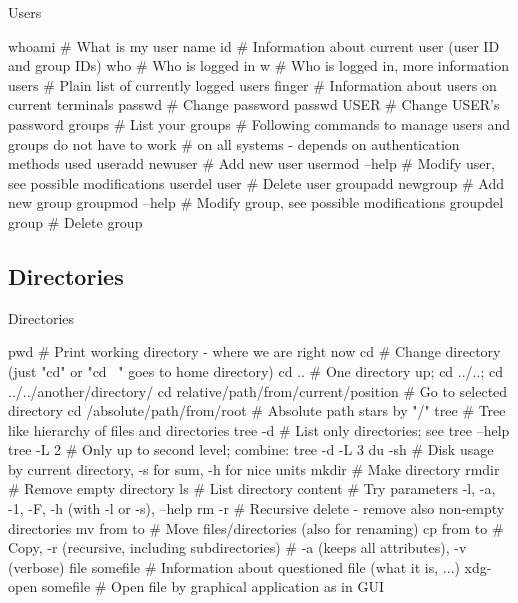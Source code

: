 \documentclass[hyperref={bookmarks=true, unicode=true, colorlinks=true, pdftitle={Linux, command line and MetaCentrum}, plainpages=false, pdfauthor={Vojtech Zeisek}, pdfsubject={Course about use of Linux command line, writing shell scripts and using MetaCentrum of CESNET}, pdfcreator={XeLaTeX, http://www.xelatex.org/}, pdfkeywords={Linux, GNU, BASH, shell, command line, MetaCentrum}, linkcolor=Sienna, anchorcolor=black, citecolor=green, filecolor=magenta, menucolor=Sienna, urlcolor=cyan, pdftex}, compress, ucs, xelatex, xcolor=svgnames, 11pt]{beamer}
\begin{document}
\begin{frame}[fragile]{Users}
  \begin{bashcode}
    whoami # What is my user name
    id # Information about current user (user ID and group IDs)
    who # Who is logged in
    w # Who is logged in, more information
    users # Plain list of currently logged users
    finger # Information about users on current terminals
    passwd # Change password
    passwd USER # Change USER's password
    groups # List your groups
    # Following commands to manage users and groups do not have to work
    # on all systems - depends on authentication methods used
    useradd newuser # Add new user
    usermod --help # Modify user, see possible modifications
    userdel user # Delete user
    groupadd newgroup # Add new group
    groupmod --help # Modify group, see possible modifications
    groupdel group # Delete group
  \end{bashcode}
\end{frame}

\subsection{Directories}

\begin{frame}[fragile]{Directories}
  \begin{bashcode}
    pwd # Print working directory - where we are right now
    cd # Change directory (just "cd" or "cd ~" goes to home directory)
    cd .. # One directory up; cd ../..; cd ../../another/directory/
    cd relative/path/from/current/position # Go to selected directory
    cd /absolute/path/from/root # Absolute path stars by "/"
    tree # Tree like hierarchy of files and directories
    tree -d # List only directories; see tree --help
    tree -L 2 # Only up to second level; combine: tree -d -L 3
    du -sh # Disk usage by current directory, -s for sum, -h for nice units
    mkdir # Make directory
    rmdir # Remove empty directory
    ls # List directory content
       # Try parameters -l, -a, -1, -F, -h (with -l or -s), --help
    rm -r # Recursive delete - remove also non-empty directories
    mv from to # Move files/directories (also for renaming)
    cp from to # Copy, -r (recursive, including subdirectories)        
               # -a (keeps all attributes), -v (verbose)
    file somefile # Information about questioned file (what it is, ...)
    xdg-open somefile # Open file by graphical application as in GUI
  \end{bashcode}
\end{frame}
\end{document}
